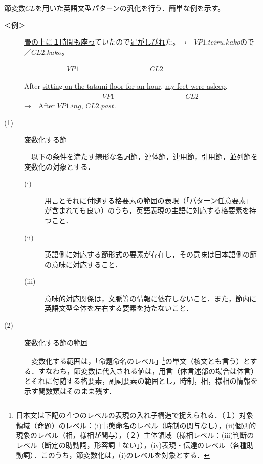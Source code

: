 \documentclass{nlp}
\begin{document}
節変数$CL$を用いた英語文型パターンの汎化を行う．簡単な例を示す。
\begin{description}
\item[＜例＞]

\underline{畳の上に１時間も座っ}ていたので\underline{足がしびれ}た。→　$VP1.teiru.kako$ので／$CL2.kako$。

　　　　　　$VP1$　　　　　　　　　　$CL2$

After \underline{sitting on the tatami floor for an hour}, \underline{my feet were asleep}.　\\
　　　　　　　　　　　$VP1$　　　　　　　　　　$CL2$  \\
\hspace{8cm}→　After $VP1.ing$, $CL2.past$. 


\end{description}

\begin{description}
\item[(1)]変数化する節

　以下の条件を満たす線形な名詞節，連体節，連用節，引用節，並列節を変数化の対象とする．

\begin{description}
\item[(i)]用言とそれに付随する格要素の範囲の表現（「パターン任意要素」が含まれても良い）のうち，英語表現の主語に対応する格要素を持つこと．
\item[(ii)]英語側に対応する節形式の要素が存在し，その意味は日本語側の節の意味に対応すること．
\item[(iii)]意味的対応関係は，文脈等の情報に依存しないこと．また，節内に英語文型全体を左右する要素を持たないこと．
\end{description}

\item[(2)]変数化する節の範囲

　変数化する範囲は，「命題命名のレベル」\footnote{日本文は下記の４つのレベルの表現の入れ子構造で捉えられる．（１）対象領域（命題）のレベル：(i)事態命名のレベル（時制の関与なし），(ii)個別的現象のレベル（相，様相が関与），（２）主体領域（様相レベル：(iii)判断のレベル（断定の助動詞，形容詞「ない」），(iv)表現・伝達のレベル（各種助動詞）．このうち，節変数化は，(i)のレベルを対象とする．}の単文（核文とも言う）とする．すなわち，節変数に代入される値は，用言（体言述部の場合は体言）とそれに付随する格要素，副詞要素の範囲とし，時制，相，様相の情報を示す関数類はそのまま残す．

\end{description}
\end{document}
